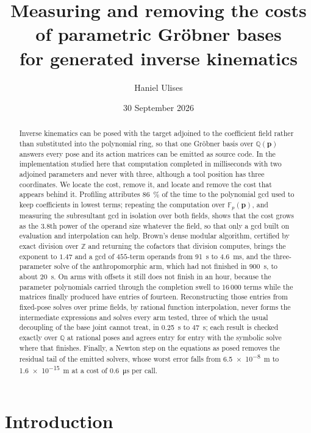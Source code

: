 \documentclass[11pt,a4paper]{article}
\title{\bfseries Measuring and removing the costs\\ of parametric Gr\"obner bases\\
for generated inverse kinematics}
\author{Haniel Ulises}
\date{30 September 2026}
\theoremstyle{plain}
\theoremstyle{definition}
\theoremstyle{remark}
\newcommand{\FF}{\mathbb{F}}
\newcommand{\QQ}{\mathbb{Q}}
\newcommand{\bp}{\boldsymbol{p}}
\begin{document}
\maketitle

\begin{abstract}
\noindent
Inverse kinematics can be posed with the target adjoined to the coefficient field rather than
substituted into the polynomial ring, so that one Gr\"obner basis over $\QQ(\bp)$ answers every pose
and its action matrices can be emitted as source code. In the implementation studied here that
computation completed in milliseconds with two adjoined parameters and never with three, although a
tool position has three coordinates. We locate the cost, remove it, and locate and remove the cost
that appears behind it. Profiling attributes \SI{86}{\percent} of the time to the polynomial gcd used
to keep coefficients in lowest terms; repeating the computation over $\FF_p(\bp)$, and measuring the
subresultant gcd in isolation over both fields, shows that the cost grows as the $3.8$th power of the
operand size whatever the field, so that only a gcd built on evaluation and interpolation can help.
Brown's dense modular algorithm, certified by exact division over $\mathbb{Z}$ and returning the
cofactors that division computes, brings the exponent to $1.47$ and a gcd of $455$-term operands from
\SI{91}{\second} to \SI{4.6}{\milli\second}, and the three-parameter solve of the anthropomorphic arm,
which had not finished in \SI{900}{\second}, to about \SI{20}{\second}. On arms with offsets it still
does not finish in an hour, because the parameter polynomials carried through the completion swell to
$16\,000$ terms while the matrices finally produced have entries of fourteen. Reconstructing those
entries from fixed-pose solves over prime fields, by rational function interpolation, never forms the
intermediate expressions and solves every arm tested, three of which the usual decoupling of the base
joint cannot treat, in \SI{0.25}{\second} to \SI{47}{\second}; each result is checked exactly over
$\QQ$ at rational poses and agrees entry for entry with the symbolic solve where that finishes. Finally, a Newton step on the equations as posed
removes the residual tail of the emitted solvers, whose worst error falls from
\SI{6.5e-8}{\metre} to \SI{1.6e-15}{\metre} at a cost of \SI{0.6}{\micro\second} per call.
\end{abstract}

\section{Introduction}
\label{sec:introduction}
\end{document}
